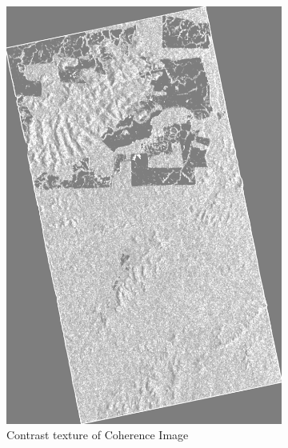 \begin{figure}[H]
\begin{subfigure}[b]{0.4\linewidth}
    \includegraphics[width=\linewidth]{Chapter4/glcm_textures/contrastimage.png}
    \caption{Contrast texture of Coherence Image}
  \end{subfigure}
  \begin{subfigure}[b]{0.4\linewidth}

\end{subfigure}
\end{figure}

